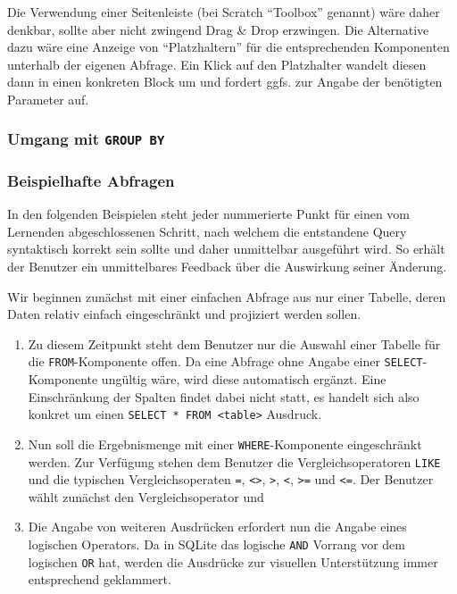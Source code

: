 \documentclass[paper=a4,fontsize=11pt,parskip=half]{scrartcl}
\begin{document}
Die Verwendung einer Seitenleiste (bei Scratch ``Toolbox'' genannt) wäre daher denkbar, sollte aber nicht zwingend Drag \& Drop erzwingen. Die Alternative dazu wäre eine Anzeige von ``Platzhaltern'' für die entsprechenden Komponenten unterhalb der eigenen Abfrage. Ein Klick auf den Platzhalter wandelt diesen dann in einen konkreten Block um und fordert ggfs. zur Angabe der benötigten Parameter auf.


\subsubsection{Umgang mit \texttt{GROUP BY}}

\subsubsection{Beispielhafte Abfragen}
\label{sec:example-queries}

In den folgenden Beispielen steht jeder nummerierte Punkt für einen vom Lernenden abgeschlossenen Schritt, nach welchem die entstandene Query syntaktisch korrekt sein sollte und daher unmittelbar ausgeführt wird. So erhält der Benutzer ein unmittelbares Feedback über die Auswirkung seiner Änderung.

Wir beginnen zunächst mit einer einfachen Abfrage aus nur einer Tabelle, deren Daten relativ einfach eingeschränkt und projiziert werden sollen.

\begin{enumerate}
  \item Zu diesem Zeitpunkt steht dem Benutzer nur die Auswahl einer Tabelle für die \texttt{FROM}-Komponente offen. Da eine Abfrage ohne Angabe einer \texttt{SELECT}-Komponente ungültig wäre, wird diese automatisch ergänzt. Eine Einschränkung der Spalten findet dabei nicht statt, es handelt sich also konkret um einen \texttt{SELECT * FROM <table>} Ausdruck.
  \item Nun soll die Ergebnismenge mit einer \texttt{WHERE}-Komponente eingeschränkt werden. Zur Verfügung stehen dem Benutzer die Vergleichsoperatoren \texttt{LIKE} und die typischen Vergleichsoperaten \texttt{=}, \texttt{<>}, \texttt{>}, \texttt{<}, \texttt{>=} und \texttt{<=}. Der Benutzer wählt zunächst den Vergleichsoperator und
  \item Die Angabe von weiteren Ausdrücken erfordert nun die Angabe eines logischen Operators. Da in SQLite das logische \texttt{AND} Vorrang vor dem logischen \texttt{OR} hat, werden die Ausdrücke zur visuellen Unterstützung immer entsprechend geklammert.
\end{enumerate}
\end{document}
